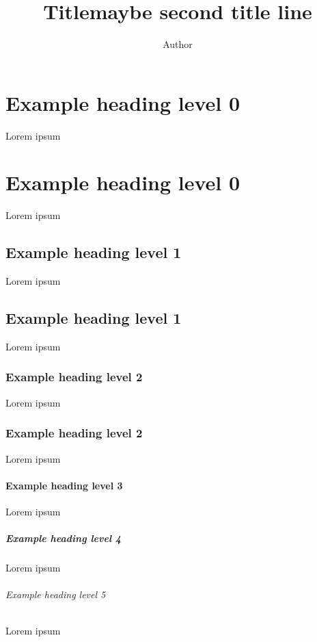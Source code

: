 \documentclass[
 UKenglish%
 ]{report}
\title{Title\break maybe second title line}
\author{Author}
\begin{document}
\maketitle

\chapter{Example heading level 0}%
Lorem ipsum

\chapter*{Example heading level 0}%
Lorem ipsum

\section{Example heading level 1}
Lorem ipsum

\section*{Example heading level 1}
Lorem ipsum

\subsection{Example heading level 2}
Lorem ipsum

\subsection*{Example heading level 2}
Lorem ipsum

\subsubsection{Example heading level 3}
Lorem ipsum

\paragraph{Example heading level 4}
Lorem ipsum

\subparagraph{Example heading level 5}
Lorem ipsum
\end{document}
